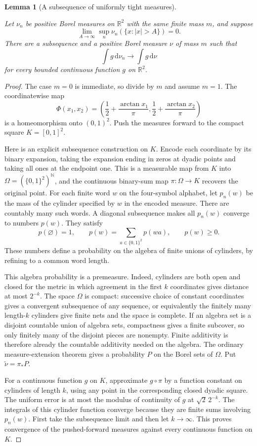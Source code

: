 \documentclass[11pt]{amsart}
\newcommand{\R}{\mathbb R}
\newcommand{\N}{\mathbb N}
\newcommand{\dd}{\,\mathrm d}
\newtheorem{lemma}[theorem]{Lemma}
\theoremstyle{definition}
\theoremstyle{remark}
\numberwithin{equation}{section}
\providecommand{\lean}[1]{}
\providecommand{\leanok}{}
\begin{document}
\begin{lemma}[A subsequence of uniformly tight measures]
\label{ext:tight-measures}
\lean{Auto.ext_tight_measures}
\leanok
Let $\nu_n$ be positive Borel measures on $\R^2$ with the
same finite mass $m$, and suppose
\[
 \lim_{A\to\infty}\sup_n\nu_n(\{x:|x|>A\})=0.
\]
There are a subsequence and a positive Borel measure $\nu$
of mass $m$ such that
\[
 \int g\dd\nu_n\longrightarrow\int g\dd\nu
\]
for every bounded continuous function $g$ on $\R^2$.
\end{lemma}
\begin{proof}
The case $m=0$ is immediate, so divide by $m$ and assume
$m=1$.  The coordinatewise map
\[
 \Phi(x_1,x_2)=
 \left(\frac12+\frac{\arctan x_1}{\pi},
       \frac12+\frac{\arctan x_2}{\pi}\right)
\]
is a homeomorphism onto $(0,1)^2$.  Push the measures forward
to the compact square $K=[0,1]^2$.

Here is an explicit subsequence construction on $K$.  Encode
each coordinate by its binary expansion, taking the expansion
ending in zeros at dyadic points and taking all ones at the
endpoint one.  This is a measurable map from $K$ into
$\Omega=(\{0,1\}^2)^{\N}$, and the continuous binary-sum
map $\pi:\Omega\to K$ recovers the original point.
For each finite word $w$ on the four-symbol alphabet, let
$p_n(w)$ be the mass of the cylinder specified by $w$ in
the encoded measure.  There are countably many such words.
A diagonal subsequence makes all $p_n(w)$ converge to numbers
$p(w)$.  They satisfy
\[
 p(\varnothing)=1,
 \qquad p(w)=\sum_{a\in\{0,1\}^2}p(wa),
 \qquad p(w)\ge0.
\]
These numbers define a probability on the algebra of finite
unions of cylinders, by refining to a common word length.

This algebra probability is a premeasure.  Indeed, cylinders
are both open and closed for the metric in which agreement
in the first $k$ coordinates gives distance at most $2^{-k}$.
The space $\Omega$ is compact: successive choice of constant
coordinates gives a convergent subsequence of any sequence,
or equivalently the finitely many length-$k$ cylinders give
finite nets and the space is complete.  If an algebra set is
a disjoint countable union of algebra sets, compactness gives
a finite subcover, so only finitely many of the disjoint
pieces are nonempty.  Finite additivity is therefore already
the countable additivity needed on the algebra.  The ordinary
measure-extension theorem gives a probability $P$ on the
Borel sets of $\Omega$.  Put $\widetilde\nu=\pi_*P$.

For a continuous function $g$ on $K$, approximate $g\circ\pi$
by a function constant on cylinders of length $k$, using any
point in the corresponding closed dyadic square.  The
uniform error is at most the modulus of continuity of $g$
at $\sqrt2\,2^{-k}$.  The integrals of this cylinder function
converge because they are finite sums involving $p_n(w)$.
First take the subsequence limit and then let $k\to\infty$.
This proves convergence of the pushed-forward measures
against every continuous function on $K$.


\end{proof}
\end{document}
